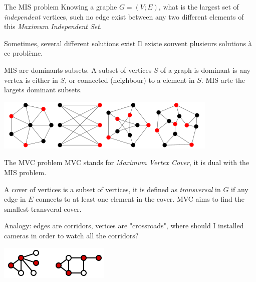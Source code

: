 \begin{frame}{The MIS problem}
Knowing a graphe $G = (V ; E)$, what is the largest set of \textit{independent} vertices, such no edge exist between
any two different elements of this \textit{Maximum Independent Set}.

Sometimes, several different solutions exist 
Il existe souvent plusieurs solutions à ce problème.
\newline

MIS are dominants subsets. A subset of vertices $S$ of a graph is dominant is any vertex is either in $S$, or connected 
(neighbour) to a element in $S$. MIS arte the largets dominant subsets.

\centering
\includegraphics[scale=0.8]{images/MaximumIndependentSet_1000.png}
\end{frame}

\begin{frame}{The MVC problem}
MVC stands for \textit{Maximum Vertex Cover}, it is dual with the MIS problem. 

A cover of vertices is a subset of vertices, it is defined as \textit{transversal} in $G$ if any edge in $E$ connects
to at least one element in the cover. MVC aims to find the smallest transveral cover. 
\newline

Analogy: edges are corridors, verices are "crossroads", where should I installed cameras in order to watch all the 
corridors?

\centering
\includegraphics[scale=1.0]{images/Vertex-cover.svg.png}
\end{frame}

